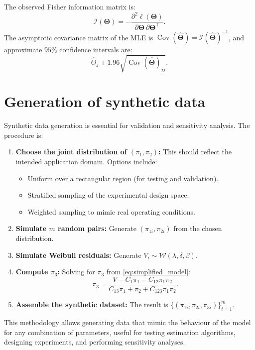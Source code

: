 The observed Fisher information matrix is:
\[
\mathcal{I}(\boldsymbol{\Theta}) = -\frac{\partial^2 \ell(\boldsymbol{\Theta})}{\partial \boldsymbol{\Theta}\,\partial \boldsymbol{\Theta}^{\!\top}}.
\]
The asymptotic covariance matrix of the MLE is \(\operatorname{Cov}(\hat{\boldsymbol{\Theta}}) = \mathcal{I}(\hat{\boldsymbol{\Theta}})^{-1}\), and approximate \(95\%\) confidence intervals are:
\[
\hat{\Theta}_j \pm 1.96 \sqrt{\operatorname{Cov}(\hat{\boldsymbol{\Theta}})_{jj}}.
\]

\section{Generation of synthetic data}
\label{sec:synthetic-data-generation}

Synthetic data generation is essential for validation and sensitivity analysis. The procedure is:

\begin{enumerate}
    \item \textbf{Choose the joint distribution of \((\pi_1,\pi_2)\):} This should reflect the intended application domain. Options include:
    \begin{itemize}
        \item Uniform over a rectangular region (for testing and validation).
        \item Stratified sampling of the experimental design space.
        \item Weighted sampling to mimic real operating conditions.
    \end{itemize}
    \item \textbf{Simulate \(m\) random pairs:} Generate \((\pi_{1i},\pi_{2i})\) from the chosen distribution.
    \item \textbf{Simulate Weibull residuals:} Generate \(V_i \sim \mathcal{W}(\lambda,\delta,\beta)\).
    \item \textbf{Compute \(\pi_3\):} Solving for \(\pi_3\) from \eqref{eq:simplified_model}:
    \begin{equation}\label{eq:pi3_synthetic}
    \pi_3 = \frac{V - C_1\pi_1 - C_{12}\pi_1\pi_2}{C_{13}\pi_1 + \pi_2 + C_{123}\pi_1\pi_2}.
    \end{equation}
    \item \textbf{Assemble the synthetic dataset:} The result is \(\{(\pi_{1i},\pi_{2i},\pi_{3i})\}_{i=1}^m\).
\end{enumerate}

This methodology allows generating data that mimic the behaviour of the model for any combination of parameters, useful for testing estimation algorithms, designing experiments, and performing sensitivity analyses.

